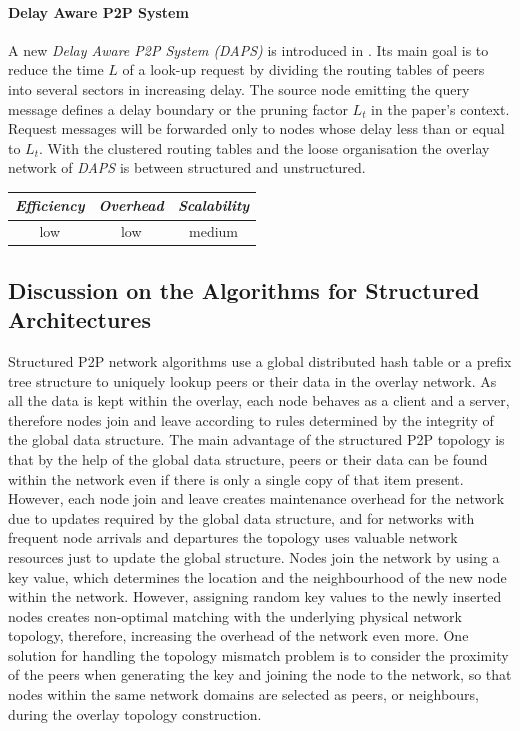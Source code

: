 \paragraph*{ \bf Delay Aware P2P System}
A new \emph{Delay Aware P2P System (DAPS)} is introduced in \cite{ZL2005}. Its
main goal is to reduce the time $L$ of a look-up request by dividing the routing
tables of peers into several sectors in increasing delay. The source node
emitting the query message defines a delay boundary or the pruning factor $L_t$
in the paper's context. Request messages will be forwarded only to nodes whose
delay less than or equal to $L_t$. With the clustered routing tables and the
loose organisation the overlay network of \emph{DAPS} is between structured and
unstructured.

\begin{center}
\begin{tabular}{ccc}
\emph{Efficiency} & \emph{Overhead} & \emph{Scalability} \\
\hline
%
low &
%
low &
%
medium
\end{tabular}
\end{center}

\subsection{Discussion on the Algorithms for Structured Architectures}
Structured P2P network algorithms use a global distributed hash table or a
prefix tree structure to uniquely lookup peers or their data in the overlay
network. As all the data is kept within the overlay, each node behaves as a
client and a server, therefore nodes join and leave according to rules
determined by the integrity of the global data structure. The main advantage of
the structured P2P topology is that by the help of the global data structure,
peers or their data can be found within the network even if there is only a
single copy of that item present. However, each node join and leave creates
maintenance overhead for the network due to updates required by the global data
structure, and for networks with frequent node arrivals and departures the
topology uses valuable network resources just to update the global structure.
Nodes join the network by using a key value, which determines the location and
the neighbourhood of the new node within the network. However, assigning
random key values to the newly inserted nodes creates non-optimal matching with
the underlying physical network topology, therefore, increasing the overhead of
the network even more. One solution for handling the topology mismatch problem
is to consider the proximity of the peers when generating the key and joining
the node to the network, so that nodes within the same network domains are
selected as peers, or neighbours, during the overlay topology construction.

